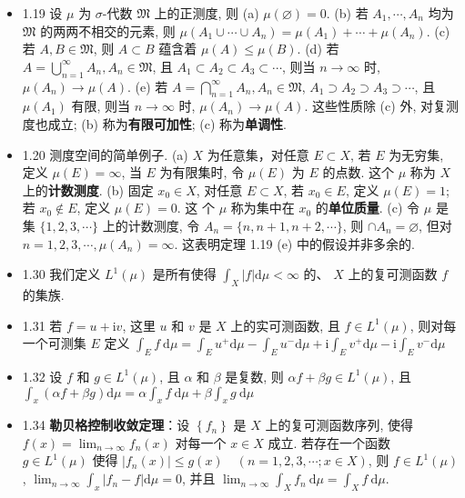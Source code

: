 \begin{itemize}
\item 1.19 设 $\mu$ 为 $\sigma$-代数 $\mathfrak{M}$ 上的正测度, 则
(a) $\mu(\varnothing)=0$.
(b) 若 $A_{1}, \cdots, A_{n}$ 均为 $\mathfrak{M}$ 的两两不相交的元素, 则
$\mu\left(A_{1} \cup \cdots \cup A_{n}\right)=\mu\left(A_{1}\right)+\cdots+\mu\left(A_{n}\right) .$
(c) 若 $A, B \in \mathfrak{M}$, 则 $A \subset B$ 蕴含着 $\mu(A) \leqslant \mu(B)$.
(d) 若 $A=\bigcup_{n=1}^{\infty} A_{n}, A_{n} \in \mathfrak{M}$, 且 $A_{1} \subset A_{2} \subset A_{3} \subset \cdots$, 则当 $n \rightarrow \infty$ 时, $\mu\left(A_{n}\right) \rightarrow \mu(A)$.
(e) 若 $A=\bigcap_{n=1}^{\infty} A_{n}, A_{n} \in \mathfrak{M}$, $A_{1} \supset A_{2} \supset A_{3} \supset \cdots$, 且 $\mu\left(A_{1}\right)$ 有限, 则当 $n \rightarrow \infty$ 时, $\mu\left(A_{n}\right) \rightarrow \mu(A)$.
这些性质除 (c) 外, 对复测度也成立; (b) 称为\textbf{有限可加性}; (c) 称为\textbf{单调性}.

\item 1.20 测度空间的简单例子.
(a) $X$ 为任意集，对任意 $E \subset X$, 若 $E$ 为无穷集, 定义 $\mu(E)=\infty$, 当 $E$ 为有限集时, 令 $\mu(E)$ 为 $E$ 的点数. 这个 $\mu$ 称为 $X$ 上的\textbf{计数测度}.
(b) 固定 $x_{0} \in X$, 对任意 $E \subset X$, 若 $x_{0} \in E$, 定义 $\mu(E)=1$; 若 $x_{0} \notin E$, 定义 $\mu(E)=0$. 这 个 $\mu$ 称为集中在 $x_{0}$ 的\textbf{单位质量}.
(c) 令 $\mu$ 是集 $\{1,2,3, \cdots\}$ 上的计数测度, 令 $A_{n}=\{n, n+1, n+2, \cdots\}$, 则 $\cap A_{n}=\varnothing$, 但对 $n=1,2,3, \cdots, \mu\left(A_{n}\right)=\infty$. 这表明定理 1.19 (e) 中的假设并非多余的.

\item 1.30 我们定义 $L^{1}(\mu)$ 是所有使得 $\int_{X}|f| \mathrm{d} \mu<\infty$ 的、 $X$ 上的复可测函数 $f$ 的集族.

\item 1.31 若 $f=u+\mathrm{i} v$, 这里 $u$ 和 $v$ 是 $X$ 上的实可测函数, 且 $f \in L^{1}(\mu)$, 则对每一个可测集 $E$ 定义 $\int_{E} f \mathrm{~d} \mu=\int_{E} u^{+} \mathrm{d} \mu-\int_{E} u^{-} \mathrm{d} \mu+\mathrm{i} \int_{E} v^{+} \mathrm{d} \mu-\mathrm{i} \int_{E} v^{-} \mathrm{d} \mu$

\item 1.32 设 $f$ 和 $g \in L^{1}(\mu)$, 且 $\alpha$ 和 $\beta$ 是复数, 则 $\alpha f+\beta g \in L^{1}(\mu)$, 且 $\int_{x}(\alpha f+\beta g) \mathrm{d} \mu=\alpha \int_{x} f \mathrm{~d} \mu+\beta \int_{x} g \mathrm{~d} \mu$

\item 1.34 \textbf{勒贝格控制收敛定理}：设 $\left\{f_{n}\right\}$ 是 $X$ 上的复可测函数序列, 使得 $f(x)=\lim _{n \rightarrow \infty} f_{n}(x)$ 对每一个 $x \in X$ 成立. 若存在一个函数 $g \in L^{1}(\mu)$ 使得 $\left|f_{n}(x)\right| \leqslant g(x) \quad(n=1,2,3, \cdots ; x \in X)$, 则 $f \in L^{1}(\mu)$, $\lim _{n \rightarrow \infty} \int_{x}\left|f_{n}-f\right| \mathrm{d} \mu=0$, 并且 $\lim _{n \rightarrow \infty} \int_{X} f_{n} \mathrm{~d} \mu=\int_{X} f \mathrm{~d} \mu$.


\end{itemize}

